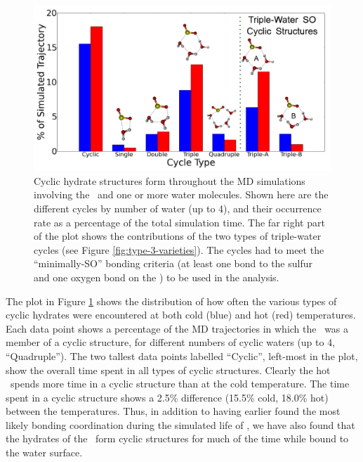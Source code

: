 \documentclass{article}
\begin{document}
\begin{figure}[h!]
	\begin{center}
		\includegraphics[scale=1.0]{cycle-distributions.png}
		\caption{Cyclic hydrate structures form throughout the MD simulations involving the \suldiox~and one or more water molecules. Shown here are the different cycles by number of water (up to 4), and their occurrence rate as a percentage of the total simulation time. The far right part of the plot shows the contributions of the two types of triple-water cycles (see Figure \ref{fig:type-3-varieties}). The cycles had to meet the ``minimally-SO'' bonding criteria (at least one bond to the sulfur and one oxygen bond on the \suldiox) to be used in the analysis.}
		\label{fig:cyclic-breakdown}
	\end{center}
\end{figure}

The plot in Figure \ref{fig:cyclic-breakdown} shows the distribution of how often the various types of cyclic hydrates were encountered at both cold (blue) and hot (red) temperatures. Each data point shows a percentage of the MD trajectories in which the \suldiox~was a member of a cyclic structure, for different numbers of cyclic waters (up to 4, ``Quadruple''). The two tallest data points labelled ``Cyclic'', left-most in the plot, show the overall time spent in all types of cyclic structures. Clearly the hot \suldiox~spends more time in a cyclic structure than at the cold temperature. The time spent in a cyclic structure shows a 2.5\% difference (15.5\% cold, 18.0\% hot) between the temperatures. Thus, in addition to having earlier found the most likely bonding coordination during the simulated life of \suldiox, we have also found that the hydrates of the \suldiox~form cyclic structures for much of the time while bound to the water surface.
\end{document}
